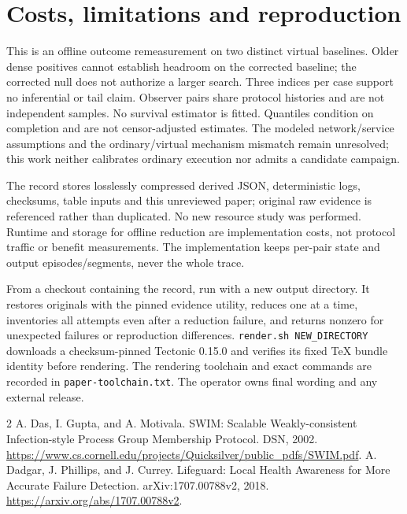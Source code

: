 \documentclass[10pt]{article}
\begin{document}
\section{Costs, limitations and reproduction}
This is an offline outcome remeasurement on two distinct virtual baselines.
Older dense positives cannot establish headroom on the corrected baseline;
the corrected null does not authorize a larger search. Three indices per case
support no inferential or tail claim. Observer pairs share protocol histories
and are not independent samples. No survival estimator is fitted. Quantiles
condition on completion and are not censor-adjusted estimates. The modeled
network/service assumptions and the ordinary/virtual mechanism mismatch remain
unresolved; this work neither calibrates ordinary execution nor admits a
candidate campaign.

The record stores losslessly compressed derived JSON, deterministic logs,
checksums, table inputs and this unreviewed paper; original raw evidence is
referenced rather than duplicated. No new resource study was performed.
Runtime and storage for offline reduction are implementation costs, not protocol
traffic or benefit measurements. The implementation keeps per-pair state and
output episodes/segments, never the whole trace.

From a checkout containing the record, run
with a new output directory.
It restores originals with the pinned evidence utility, reduces one at a time,
inventories all attempts even after a reduction failure, and returns nonzero
for unexpected failures or reproduction differences. \texttt{render.sh NEW\_DIRECTORY}
downloads a checksum-pinned Tectonic 0.15.0 and verifies its fixed TeX bundle
identity before rendering. The rendering toolchain and exact commands are
recorded in \texttt{paper-toolchain.txt}. The operator owns final wording and
any external release.

\begin{thebibliography}{2}
 A. Das, I. Gupta, and A. Motivala.
SWIM: Scalable Weakly-consistent Infection-style Process Group Membership
Protocol. DSN, 2002.
\url{https://www.cs.cornell.edu/projects/Quicksilver/public_pdfs/SWIM.pdf}.
 A. Dadgar, J. Phillips, and J. Currey.
Lifeguard: Local Health Awareness for More Accurate Failure Detection.
arXiv:1707.00788v2, 2018. \url{https://arxiv.org/abs/1707.00788v2}.
\end{thebibliography}
\end{document}

